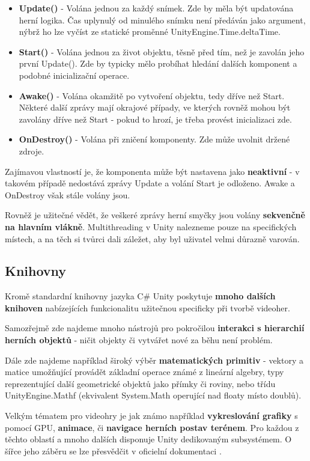 \begin{itemize}
    \item \textbf{Update()} - Volána jednou za každý snímek. Zde by měla být updatována herní logika. Čas uplynulý od minulého snímku není předáván jako argument, nýbrž ho lze vyčíst ze statické proměnné UnityEngine.Time.deltaTime.
    \item \textbf{Start()} - Volána jednou za život objektu, těsně před tím, než je zavolán jeho první Update(). Zde by typicky mělo probíhat hledání dalších komponent a podobné inicializační operace.
    \item \textbf{Awake()} - Volána okamžitě po vytvoření objektu, tedy dříve než Start. Některé další zprávy mají okrajové případy, ve kterých rovněž mohou být zavolány dříve než Start - pokud to hrozí, je třeba provést inicializaci zde.
    \item \textbf{OnDestroy()} - Volána při zničení komponenty. Zde může uvolnit držené zdroje.
\end{itemize}
Zajímavou vlastností je, že komponenta může být nastavena jako \textbf{neaktivní} - v takovém případě nedostává zprávy Update a volání Start je odloženo. Awake a OnDestroy však stále volány jsou.

Rovněž je užitečné vědět, že veškeré zprávy herní smyčky jsou volány \textbf{sekvenčně na hlavním vlákně}. Multithreading v Unity nalezneme pouze na specifických místech, a na těch si tvůrci dali záležet, aby byl uživatel velmi důrazně varován.


\subsection{Knihovny}

Kromě standardní knihovny jazyka C\# Unity poskytuje \textbf{mnoho dalších knihoven} nabízejících funkcionalitu užitečnou specificky při tvorbě videoher.

Samozřejmě zde najdeme mnoho nástrojů pro pokročilou \textbf{interakci s hierarchií herních objektů} - ničit objekty či vytvářet nové za běhu není problém. 

Dále zde najdeme například široký výběr \textbf{matematických primitiv} - vektory a matice umožňující provádět základní operace známé z lineární algebry, typy reprezentující další geometrické objektů jako přímky či roviny, nebo třídu UnityEngine.Mathf (ekvivalent System.Math operující nad floaty místo doublů).

Velkým tématem pro videohry je jak známo například \textbf{vykreslování grafiky} s pomocí GPU, \textbf{animace}, či \textbf{navigace herních postav terénem}. Pro každou z těchto oblastí a mnoho dalších disponuje Unity dedikovaným subsystémem. O šířce jeho záběru se lze přesvědčit v oficielní dokumentaci \cite{Unity}.

